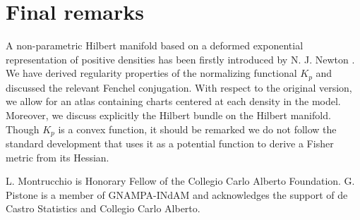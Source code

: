\documentclass[graybox]{svmult}
\begin{document}
\section{Final remarks}
\label{sec:conclusions}
A non-parametric Hilbert manifold based on a deformed exponential representation of positive densities has been firstly introduced by N. J. Newton \cite{newton:2012}. We have derived regularity properties of the normalizing functional $K_p$ and discussed the relevant Fenchel conjugation. With respect to the original version, we allow for an atlas containing charts centered at each density in the model. Moreover, we discuss explicitly the Hilbert bundle on the Hilbert manifold. Though $K_p$ is a convex function, it should be remarked we do not follow the standard development that uses it as a potential function to derive a Fisher metric from its Hessian.

\begin{acknowledgement}
L. Montrucchio is Honorary Fellow of the Collegio Carlo Alberto Foundation. G. Pistone is a member of GNAMPA-INdAM and acknowledges the support of de Castro Statistics and Collegio Carlo Alberto.
\end{acknowledgement}


%
\end{document}
